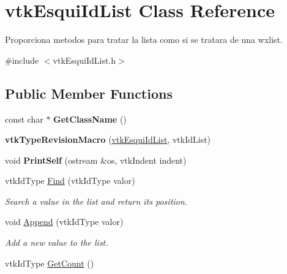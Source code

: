 \hypertarget{classvtkEsquiIdList}{
\section{vtkEsquiIdList Class Reference}
\label{classvtkEsquiIdList}
}


Proporciona metodos para tratar la lista como si se tratara de una wxlist.  


{\ttfamily \#include $<$vtkEsquiIdList.h$>$}\subsection*{Public Member Functions}
\begin{DoxyCompactItemize}
\item 
\hypertarget{classvtkEsquiIdList_a6655ba3810c59d5d7f800b57908bece6}{
const char $\ast$ {\bfseries GetClassName} ()}
\label{classvtkEsquiIdList_a6655ba3810c59d5d7f800b57908bece6}

\item 
\hypertarget{classvtkEsquiIdList_a34cee994ec8c091978654aa62091b9fe}{
{\bfseries vtkTypeRevisionMacro} (\hyperlink{classvtkEsquiIdList}{vtkEsquiIdList}, vtkIdList)}
\label{classvtkEsquiIdList_a34cee994ec8c091978654aa62091b9fe}

\item 
\hypertarget{classvtkEsquiIdList_a000a49461c40af80ea5afa7913ae6fb8}{
void {\bfseries PrintSelf} (ostream \&os, vtkIndent indent)}
\label{classvtkEsquiIdList_a000a49461c40af80ea5afa7913ae6fb8}

\item 
\hypertarget{classvtkEsquiIdList_a2a04fc34fee20a762c89917b0718ec3e}{
vtkIdType \hyperlink{classvtkEsquiIdList_a2a04fc34fee20a762c89917b0718ec3e}{Find} (vtkIdType valor)}
\label{classvtkEsquiIdList_a2a04fc34fee20a762c89917b0718ec3e}

\begin{DoxyCompactList}\small\item\em Search a value in the list and return its position. \item\end{DoxyCompactList}\item 
\hypertarget{classvtkEsquiIdList_a97d6b010b9130ce990f34673d4077716}{
void \hyperlink{classvtkEsquiIdList_a97d6b010b9130ce990f34673d4077716}{Append} (vtkIdType valor)}
\label{classvtkEsquiIdList_a97d6b010b9130ce990f34673d4077716}

\begin{DoxyCompactList}\small\item\em Add a new value to the list. \item\end{DoxyCompactList}\item 
\hypertarget{classvtkEsquiIdList_a66c7099ec65dd4b4e7bfab40efc299b7}{
vtkIdType \hyperlink{classvtkEsquiIdList_a66c7099ec65dd4b4e7bfab40efc299b7}{GetCount} ()}
\label{classvtkEsquiIdList_a66c7099ec65dd4b4e7bfab40efc299b7}


\end{DoxyCompactItemize}
